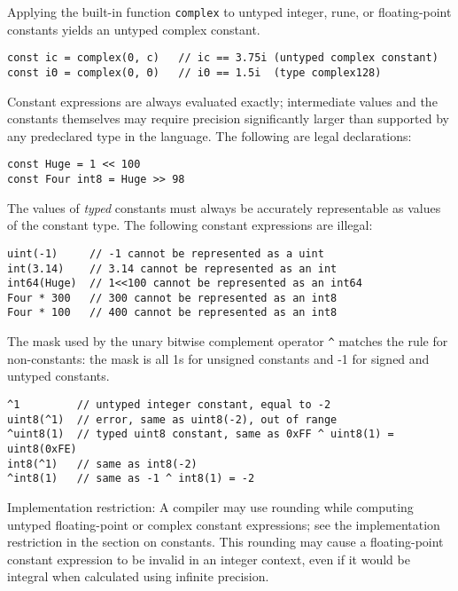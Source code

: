 Applying the built-in function \texttt{complex} to untyped integer,
rune, or floating-point constants yields an untyped complex constant.

\begin{Verbatim}[frame=single]
const ic = complex(0, c)   // ic == 3.75i (untyped complex constant)
const iΘ = complex(0, Θ)   // iΘ == 1.5i  (type complex128)
\end{Verbatim}

Constant expressions are always evaluated exactly; intermediate values
and the constants themselves may require precision significantly larger
than supported by any predeclared type in the language. The following
are legal declarations:

\begin{Verbatim}[frame=single]
const Huge = 1 << 100
const Four int8 = Huge >> 98
\end{Verbatim}

The values of \emph{typed} constants must always be accurately
representable as values of the constant type. The following constant
expressions are illegal:

\begin{Verbatim}[frame=single]
uint(-1)     // -1 cannot be represented as a uint
int(3.14)    // 3.14 cannot be represented as an int
int64(Huge)  // 1<<100 cannot be represented as an int64
Four * 300   // 300 cannot be represented as an int8
Four * 100   // 400 cannot be represented as an int8
\end{Verbatim}

The mask used by the unary bitwise complement operator \texttt{\^{}}
matches the rule for non-constants: the mask is all 1s for unsigned
constants and -1 for signed and untyped constants.

\begin{Verbatim}[frame=single]
^1         // untyped integer constant, equal to -2
uint8(^1)  // error, same as uint8(-2), out of range
^uint8(1)  // typed uint8 constant, same as 0xFF ^ uint8(1) = uint8(0xFE)
int8(^1)   // same as int8(-2)
^int8(1)   // same as -1 ^ int8(1) = -2
\end{Verbatim}

Implementation restriction: A compiler may use rounding while computing
untyped floating-point or complex constant expressions; see the
implementation restriction in the section on
constants. This rounding may cause a
floating-point constant expression to be invalid in an integer context,
even if it would be integral when calculated using infinite precision.

